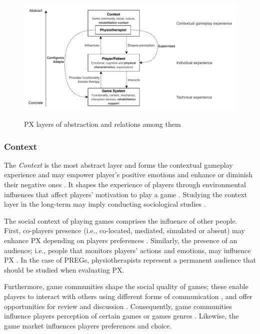 \begin{figure}[bth]
\myfloatalign
{\includegraphics[width=\linewidth]{gfx/model/layersOfAbstraction}} \quad
\caption{\ac{PX} layers of abstraction and relations among them} \label{fig:layersOfAbstraction}
\end{figure}

\subsubsection*{Context}

The \textit{Context} is the most abstract layer and forms the contextual gameplay experience and may empower player's positive emotions and enhance or diminish their negative ones \autocite{DeKort2007b}. It shapes the experience of players through environmental influences that affect players' motivation to play a game \autocite{Elson2014}. Studying the context layer in the long-term may imply conducting sociological studies \autocite{Nacked}.

The social context of playing games \autocite{Mayra,DeKort2007b,Elson2014} comprises the influence of other people. First, co-players presence \autocite{Nacked,Nackea2,Nackea,DeKort2007b,Elson2014,Mayra} (i.e., co-located, mediated, simulated or absent) may enhance \ac{PX} depending on players preferences \autocite{DeKort2007b}. Similarly, the presence of an audience; i.e., people that monitors players' actions and emotions, may influence \ac{PX} \autocite{DeKort2007b,Mayra,Nackea2}. In the case of \acp{PREG}, physiotherapists represent a permanent audience that should be studied when evaluating \ac{PX}. 

Furthermore, game communities \autocite{Nacked,Nackea2,Elson2014} shape the social quality of games; these enable players to interact with others using different forms of communication \autocite{Elson2014}, and offer opportunities for review and discussion \autocite{Nacked}. Consequently, game communities influence players perception of certain games or games genres \autocite{Nackea,Nackea2}. Likewise, the game market \autocite{Elson2014,Nackea} influences players preferences and choice.

